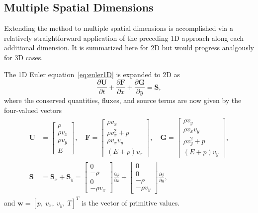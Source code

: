 \subsection{Multiple Spatial Dimensions}
\label{subsec:multiDim}

Extending the method to multiple spatial dimensions is accomplished via a relatively straightforward application of the preceding 1D approach along each additional dimension. It is summarized here for 2D but would progress analgously for 3D cases.

The 1D Euler equation~\eqref{eq:euler1D} is expanded to 2D as
\begin{equation} \label{eq:euler2D}
\frac{\partial \mathbf{U}}{\partial t}+\frac{\partial \mathbf{F}}{\partial x}+\frac{\partial \mathbf{G}}{\partial y}=\mathbf{S},
\end{equation}
where the conserved quantities, fluxes, and source terms are now given by the four-valued vectors
\begin{align}
\begin{split}
\mathbf{U}&=
\begin{bmatrix}
\rho \\ \rho v_x \\ \rho v_y \\ E
\end{bmatrix}
,\quad \mathbf{F}=
\begin{bmatrix}
\rho v_x \\ \rho v_x^2+p \\ \rho v_x v_y \\ (E+p)v_x
\end{bmatrix}
,\quad \mathbf{G}=
\begin{bmatrix}
\rho v_y \\ \rho v_x v_y \\ \rho v_y^2+p \\ (E+p)v_y
\end{bmatrix}, \\
\mathbf{S}&=\mathbf{S}_x+\mathbf{S}_y=
\begin{bmatrix}
0 \\ -\rho \\ 0 \\ -\rho v_x
\end{bmatrix} \frac{\partial \phi}{\partial x} +
\begin{bmatrix}
0 \\ 0 \\ -\rho \\ -\rho v_y
\end{bmatrix} \frac{\partial \phi}{\partial y},
\end{split}
\end{align}
and $\mathbf{w}=[p,\ v_x,\  v_y,\ T]^T$ is the vector of primitive values.

